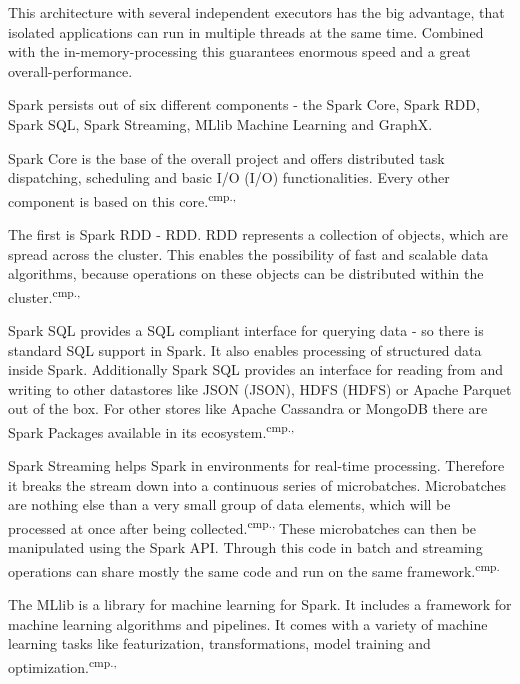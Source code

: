 This architecture with several independent executors has the big advantage, that isolated applications can run in multiple threads at the same time. Combined with the in-memory-processing this guarantees enormous speed and a great overall-performance.

Spark persists out of six different components - the Spark Core, Spark \acs{RDD}, Spark SQL, Spark Streaming, MLlib Machine Learning and GraphX.

Spark Core is the base of the overall project and offers distributed task dispatching, scheduling and basic \acs{I/O} (\acl{I/O}) functionalities. Every other component is based on this core.\textsuperscript{cmp.\cite{26}, \cite{28}}

The first is Spark RDD - \acl{RDD}. RDD represents a collection of objects, which are spread across the cluster. This enables the possibility of fast and scalable data algorithms, because operations on these objects can be distributed within the cluster.\textsuperscript{cmp.\cite{26}, \cite{28}}

Spark SQL provides a SQL compliant interface for querying data - so there is standard SQL support in Spark. It also enables processing of structured data inside Spark. Additionally Spark SQL provides an interface for reading from and writing to other datastores like \acs{JSON} (\acl{JSON}), \acs{HDFS} (\acl{HDFS}) or Apache Parquet out of the box. For other stores like Apache Cassandra or MongoDB there are Spark Packages available in its ecosystem.\textsuperscript{cmp.\cite{26}, \cite{28}}

Spark Streaming helps Spark in environments for real-time processing. Therefore it breaks the stream down into a continuous series of microbatches. Microbatches are nothing else than a very small group of data elements, which will be processed at once after being collected.\textsuperscript{cmp.\cite{26}, \cite{28}}These microbatches can then be manipulated using the Spark API. Through this code in batch and streaming operations can share mostly the same code and run on the same framework.\textsuperscript{cmp.\cite{27}}

The MLlib is a library for machine learning for Spark. It includes a framework for machine learning algorithms and pipelines. It comes with a variety of machine learning tasks like featurization, transformations, model training and optimization.\textsuperscript{cmp.\cite{26}, \cite{28}}


